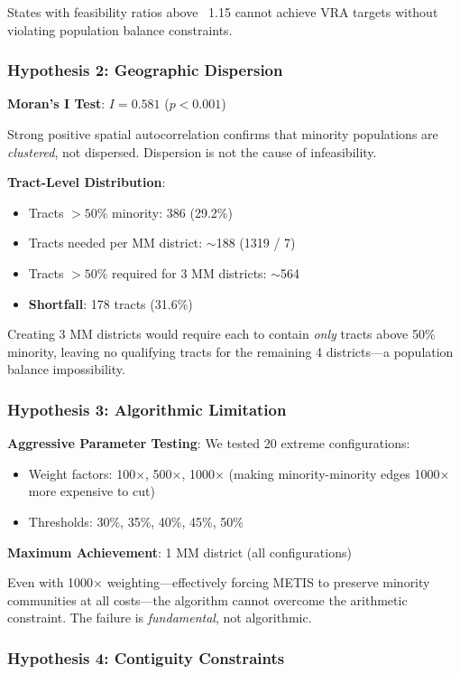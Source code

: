 States with feasibility ratios above ~1.15 cannot achieve VRA targets without violating population balance constraints.

\subsubsection{Hypothesis 2: Geographic Dispersion}

\textbf{Moran's I Test}: $I = 0.581$ ($p < 0.001$)

Strong positive spatial autocorrelation confirms that minority populations are \textit{clustered}, not dispersed. Dispersion is not the cause of infeasibility.

\textbf{Tract-Level Distribution}:
\begin{itemize}
    \item Tracts $> 50\%$ minority: 386 (29.2\%)
    \item Tracts needed per MM district: $\sim$188 (1319 / 7)
    \item Tracts $> 50\%$ required for 3 MM districts: $\sim$564
    \item \textbf{Shortfall}: 178 tracts (31.6\%)
\end{itemize}

Creating 3 MM districts would require each to contain \textit{only} tracts above 50\% minority, leaving no qualifying tracts for the remaining 4 districts—a population balance impossibility.

\subsubsection{Hypothesis 3: Algorithmic Limitation}

\textbf{Aggressive Parameter Testing}: We tested 20 extreme configurations:
\begin{itemize}
    \item Weight factors: 100×, 500×, 1000× (making minority-minority edges 1000× more expensive to cut)
    \item Thresholds: 30\%, 35\%, 40\%, 45\%, 50\%
\end{itemize}

\textbf{Maximum Achievement}: 1 MM district (all configurations)

Even with 1000× weighting—effectively forcing METIS to preserve minority communities at all costs—the algorithm cannot overcome the arithmetic constraint. The failure is \textit{fundamental}, not algorithmic.

\subsubsection{Hypothesis 4: Contiguity Constraints}

